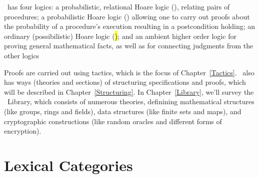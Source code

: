 \EasyCrypt\ has four logics: a probabilistic, relational Hoare logic
(\prhl), relating pairs of procedures; a probabilistic Hoare logic
(\phl) allowing one to carry out proofs about the probability of a
procedure's execution resulting in a postcondition holding; an
ordinary (possibilistic) Hoare logic (\hl); and an ambient higher
order logic for proving general mathematical facts, as well as for
connecting judgments from the other logics

Proofs are carried out using tactics, which is the focus of
Chapter~\ref{Tactics}.  \EasyCrypt\ also has ways (theories and
sections) of structuring specifications and proofs, which will be
described in Chapter~\ref{Structuring}. In Chapter~\ref{Library},
we'll survey the \EasyCrypt\ Library, which consists of numerous
theories, definining mathematical structures (like groups, rings
and fields), data structures (like finite sets and maps), and
cryptographic constructions (like random oracles and different
forms of encryption).

\section{Lexical Categories}
\label{Lexical}


